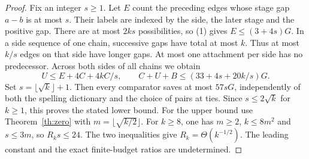\documentclass[11pt]{article}
\begin{document}
\begin{proof}
Fix an integer $s\ge1$. Let $E$ count the preceding edges whose stage gap $a-b$ is at most $s$. Their labels are indexed by the side, the later stage and the positive gap. There are at most $2ks$ possibilities, so (1) gives $E\le(3+4s)G$. In a side sequence of one chain, successive gaps have total at most $k$. Thus at most $k/s$ edges on that side have longer gaps. At most one attachment per side has no predecessor. Across both sides of all chains we obtain
\[
 U\le E+4C+4kC/s,\qquad
 C+U+B\le (33+4s+20k/s)G .
\]
Set $s=\lfloor\sqrt{k}\rfloor+1$. Then every comparator saves at most $57sG$, independently of both the spelling dictionary and the choice of pairs at ties. Since $s\le2\sqrt{k}$ for $k\ge1$, this proves the stated lower bound. For the upper bound use Theorem~\ref{th:zero} with $m=\lfloor\sqrt{k/2}\rfloor$. For $k\ge8$, one has $m\ge2$, $k\le8m^2$ and $s\le3m$, so $R_ks\le24$. The two inequalities give $R_k=\Theta(k^{-1/2})$. The leading constant and the exact finite-budget ratios are undetermined.
\end{proof}
\end{document}
